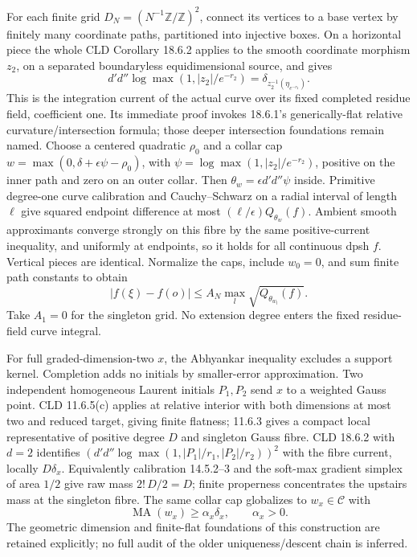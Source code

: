 \documentclass[11pt]{article}
\newcommand{\DD}{d'd''}
\newcommand{\MA}{\operatorname{MA}}
\newcommand{\C}{\mathcal C}
\begin{document}
For each finite grid $D_N=(N^{-1}\mathbb Z/\mathbb Z)^2$, connect its
vertices to a base vertex by finitely many coordinate paths, partitioned
into injective boxes. On a horizontal piece the whole CLD Corollary
18.6.2 applies to the smooth coordinate morphism $z_2$, on a separated
boundaryless equidimensional source, and gives
\[
 \DD\log\max(1,|z_2|/e^{-r_2})
 =\delta_{z_2^{-1}(\eta_{e^{-r_2}})}.
\]
This is the integration current of the actual curve over its fixed
completed residue field, coefficient one. Its immediate proof invokes
18.6.1's generically-flat relative curvature/intersection formula;
those deeper intersection foundations remain named. Choose a centered
quadratic $\rho_0$ and a collar cap
$w=\max(0,\delta+\epsilon\psi-\rho_0)$, with
$\psi=\log\max(1,|z_2|/e^{-r_2})$, positive on the inner path and
zero on an outer collar. Then $\theta_w=\epsilon\DD\psi$ inside.
Primitive degree-one curve calibration and Cauchy--Schwarz on a radial
interval of length $\ell$ give squared endpoint difference at most
$(\ell/\epsilon)Q_{\theta_w}(f)$. Ambient smooth approximants converge
strongly on this fibre by the same positive-current inequality, and
uniformly at endpoints, so it holds for all continuous dpsh $f$.
Vertical pieces are identical. Normalize the caps, include $w_0=0$,
and sum finite path constants to obtain
\begin{equation}\label{grid}
 |f(\xi)-f(o)|\le A_N\max_l\sqrt{Q_{\theta_{w_l}}(f)}.
\end{equation}
Take $A_1=0$ for the singleton grid. No extension degree enters the
fixed residue-field curve integral.

For full graded-dimension-two $x$, the Abhyankar inequality excludes a
support kernel. Completion adds no initials by smaller-error approximation.
Two independent homogeneous Laurent initials $P_1,P_2$ send $x$ to a
weighted Gauss point. CLD 11.6.5(c) applies at relative interior with
both dimensions at most two and reduced target, giving finite flatness;
11.6.3 gives a compact local representative of positive degree $D$ and
singleton Gauss fibre. CLD 18.6.2 with $d=2$ identifies
$(\DD\log\max(1,|P_1|/r_1,|P_2|/r_2))^2$ with the fibre current,
locally $D\delta_x$. Equivalently calibration 14.5.2--3 and the
soft-max gradient simplex of area $1/2$ give raw mass $2!\,D/2=D$;
finite properness concentrates the upstairs mass at the singleton fibre.
The same collar cap globalizes to $w_x\in\C$ with
\begin{equation}\label{atom}
 \MA(w_x)\ge\alpha_x\delta_x,\qquad\alpha_x>0.
\end{equation}
The geometric dimension and finite-flat foundations of this construction
are retained explicitly; no full audit of the older uniqueness/descent
chain is inferred.
\end{document}
